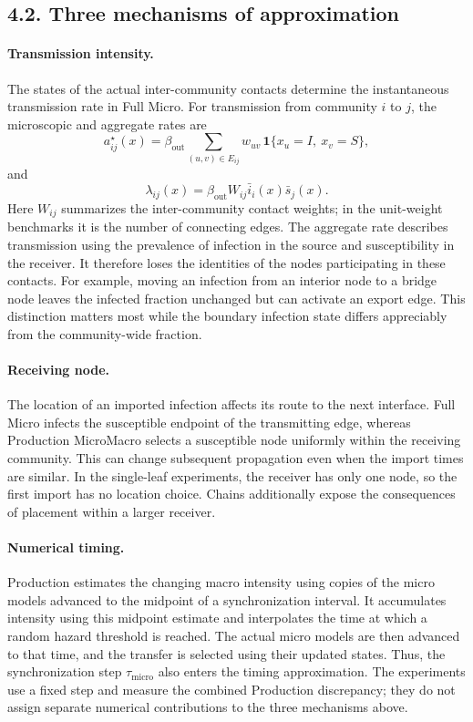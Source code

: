 \documentclass[10pt]{article}
\begin{document}
{\subsection*{4.2. Three mechanisms of approximation}
\paragraph{Transmission intensity.}
The states of the actual inter-community contacts determine the instantaneous transmission rate in Full Micro. For transmission from community $i$ to $j$, the microscopic and aggregate rates are
\begin{equation*}
a^\star_{ij}(x)=\beta_{\mathrm{out}}\sum_{(u,v)\in E_{ij}}w_{uv}\,\mathbf{1}\{x_u=I,\ x_v=S\},
\end{equation*}
and
\begin{equation*}
\lambda_{ij}(x)=\beta_{\mathrm{out}}W_{ij}\bar{i}_i(x)\bar{s}_j(x).
\end{equation*}
Here $W_{ij}$ summarizes the inter-community contact weights; in the unit-weight benchmarks it is the number of connecting edges. The aggregate rate describes transmission using the prevalence of infection in the source and susceptibility in the receiver. It therefore loses the identities of the nodes participating in these contacts. For example, moving an infection from an interior node to a bridge node leaves the infected fraction unchanged but can activate an export edge. This distinction matters most while the boundary infection state differs appreciably from the community-wide fraction.

\paragraph{Receiving node.}
The location of an imported infection affects its route to the next interface. Full Micro infects the susceptible endpoint of the transmitting edge, whereas Production MicroMacro selects a susceptible node uniformly within the receiving community. This can change subsequent propagation even when the import times are similar. In the single-leaf experiments, the receiver has only one node, so the first import has no location choice. Chains additionally expose the consequences of placement within a larger receiver.

\paragraph{Numerical timing.}
Production estimates the changing macro intensity using copies of the micro models advanced to the midpoint of a synchronization interval. It accumulates intensity using this midpoint estimate and interpolates the time at which a random hazard threshold is reached. The actual micro models are then advanced to that time, and the transfer is selected using their updated states. Thus, the synchronization step $\tau_{\mathrm{micro}}$ also enters the timing approximation. The experiments use a fixed step and measure the combined Production discrepancy; they do not assign separate numerical contributions to the three mechanisms above.
}
\end{document}
